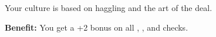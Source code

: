 
Your culture is based on haggling and the art of the deal.

\textbf{Benefit:} You get a +2 bonus on all , , and  checks.